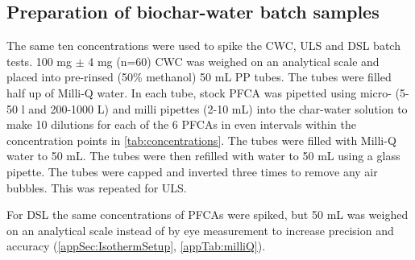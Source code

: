 \begin{table}
    \caption{Spike concentrations for each PFCA batch test.}
    \label{tab:concentrations}
\end{table}

\subsection{Preparation of biochar-water batch samples}
The same ten concentrations were used to spike the CWC, ULS and DSL batch tests. 100 mg $\pm$ 4 mg (n=60) CWC was weighed on an analytical scale and placed into pre-rinsed (50\% methanol) 50 mL PP tubes. The tubes were filled half up of Milli-Q water. In each tube, stock PFCA was pipetted using micro- (5-50 {\textmu}l and 200-1000 {\textmu}L) and milli pipettes (2-10 mL) into the char-water solution to make 10 dilutions for each of the 6 PFCAs in even intervals within the concentration points in \cref{tab:concentrations}. The tubes were filled with Milli-Q water to 50 mL. The tubes were then refilled with water to 50 mL using a glass pipette. The tubes were capped and inverted three times to remove any air bubbles. This was repeated for ULS. 

For DSL the same concentrations of PFCAs were spiked, but 50 mL was weighed on an analytical scale instead of by eye measurement to increase precision and accuracy (\cref{appSec:IsothermSetup}, \cref{appTab:milliQ}).


